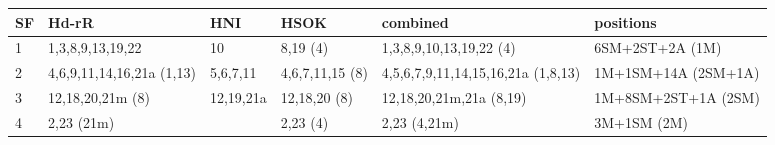 \begin{tabular}{p{0.6cm}p{3.4cm}p{1.5cm}p{2cm}p{4.5cm}p{3.7cm}}
  \hline
  SF & Hd-rR & HNI & HSOK & combined & positions \\ \hline
  1 & 1,3,8,9,13,19,22          & 10        & 8,19 (4)        & 1,3,8,9,10,13,19,22 (4)            & 6SM+2ST+2A (1M) \\
  2 & 4,6,9,11,14,16,21a (1,13) & 5,6,7,11  & 4,6,7,11,15 (8) & 4,5,6,7,9,11,14,15,16,21a (1,8,13) & 1M+1SM+14A (2SM+1A) \\
  3 & 12,18,20,21m (8)          & 12,19,21a & 12,18,20 (8)    & 12,18,20,21m,21a (8,19)            & 1M+8SM+2ST+1A (2SM) \\
  4 & 2,23 (21m)                &           & 2,23 (4)        & 2,23 (4,21m)                       & 3M+1SM (2M) \\
  \hline
\end{tabular}

